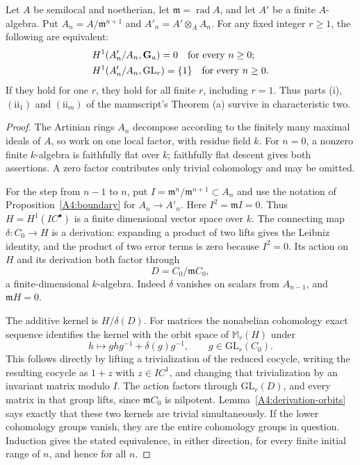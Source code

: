 \begin{proposition}
\label{A4:finite-rank-equivalence}
Let $A$ be semilocal and noetherian, let $\mathfrak m=\operatorname{rad}A$,
and let $A'$ be a finite $A$-algebra.  Put
$A_n=A/\mathfrak m^{n+1}$ and $A'_n=A'\otimes_A A_n$.
For any fixed integer $r\geq1$, the following are equivalent:
\[
 \begin{split}
 &H^1(A'_n/A_n,\mathbf G_a)=0\quad\hbox{for every }n\geq0;\\
 &H^1(A'_n/A_n,\mathrm{GL}_r)=\{1\}\quad\hbox{for every }n\geq0.
 \end{split}
\]
If they hold for one $r$, they hold for all finite $r$, including $r=1$.
Thus parts (i), $(\mathrm{ii}_1)$ and $(\mathrm{ii}_m)$ of the manuscript's
Theorem (a) survive in characteristic two.
\end{proposition}
\begin{proof}
The Artinian rings $A_n$ decompose according to the finitely many maximal
ideals of $A$, so work on one local factor, with residue field $k$.
For $n=0$, a nonzero finite $k$-algebra is faithfully flat over $k$;
faithfully flat descent gives both assertions.  A zero factor contributes
only trivial cohomology and may be omitted.

For the step from $n-1$ to $n$, put
$I=\mathfrak m^n/\mathfrak m^{n+1}\subset A_n$ and use the notation of
Proposition~\ref{A4:boundary} for $A_n\to A'_n$.
Here $I^2=\mathfrak m I=0$.  Thus $H=H^1(IC^\bullet)$ is a finite
dimensional vector space over $k$.  The connecting map
$\delta:C_0\to H$ is a derivation: expanding a product of two lifts gives
the Leibniz identity, and the product of two error terms is zero because
$I^2=0$.  Its action on $H$ and its derivation both factor through
\[
                 D=C_0/\mathfrak m C_0,
\]
a finite-dimensional $k$-algebra.  Indeed $\delta$ vanishes on scalars
from $A_{n-1}$, and $\mathfrak m H=0$.

The additive kernel is $H/\delta(D)$.  For matrices the nonabelian
cohomology exact sequence identifies the kernel with the orbit space
of $\mathbb M_r(H)$ under
\[
               h\longmapsto g h g^{-1}+\delta(g)g^{-1},
               \qquad g\in\mathrm{GL}_r(C_0).
\]
This follows directly by lifting a trivialization of the reduced
cocycle, writing the resulting cocycle as $1+z$ with $z\in IC^1$, and
changing that trivialization by an invariant matrix modulo $I$.
The action factors through $\mathrm{GL}_r(D)$, and every matrix in that
group lifts, since $\mathfrak m C_0$ is nilpotent.
Lemma~\ref{A4:derivation-orbits} says exactly that these two kernels are
trivial simultaneously.  If the lower cohomology groups vanish, they
are the entire cohomology groups in question.  Induction gives the stated
equivalence, in either direction, for every finite initial range of $n$,
and hence for all $n$.
\end{proof}

